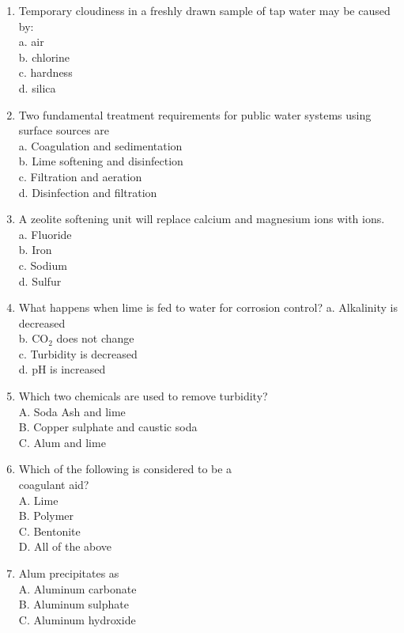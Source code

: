 \begin{enumerate}
\item Temporary cloudiness in a freshly drawn sample of tap water may be caused by:\\
a. air\\
b. chlorine\\
c. hardness\\
d. silica\\

\item Two fundamental treatment requirements for public water systems using surface sources are\\
a. Coagulation and sedimentation\\
b. Lime softening and disinfection\\
c. Filtration and aeration\\
d. Disinfection and filtration\\

\item A zeolite softening unit will replace calcium and magnesium ions with ions.\\
a. Fluoride\\
b. Iron\\
c. Sodium\\
d. Sulfur\\

\item What happens when lime is fed to water for corrosion control?
a. Alkalinity is decreased\\
b. CO$_2$ does not change\\
c. Turbidity is decreased\\
d. pH is increased\\

\item Which two chemicals are used to remove turbidity?\\
A. Soda Ash and lime\\
B. Copper sulphate and caustic soda\\
C. Alum and lime\\

\item Which of the following is considered to be a\\
coagulant aid?\\
A. Lime\\
B. Polymer\\
C. Bentonite\\
D. All of the above\\
\item Alum precipitates as\\
A. Aluminum carbonate\\
B. Aluminum sulphate\\
C. Aluminum hydroxide\\


\end{enumerate}
